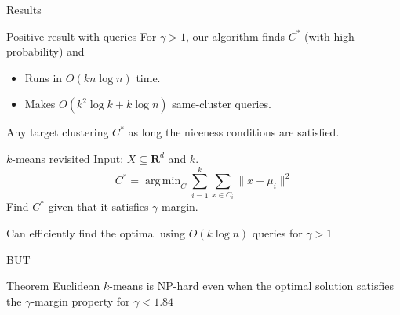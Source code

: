 \documentclass{beamer}
\newcommand{\mb}{\mathbf}
\DeclareMathOperator*{\argmin}{arg\,min}
\begin{document}
\begin{frame}{Results}

	\begin{block}{Positive result with queries}
		\vspace{10pt}For $\gamma > 1$, our algorithm finds $C^*$ (with high probability) and 
		\begin{itemize}
		\vspace{10pt}\item Runs in $O(kn\log n)$ time.
        \vspace{10pt}\item Makes $O(k^2\log k + k\log n)$ same-cluster queries.
		\end{itemize}
	\end{block}
	
	\vspace{20pt}Any target clustering $C^*$ as long the niceness conditions are satisfied. 
\end{frame}

\begin{frame}{$k$-means revisited}
	Input: $X \subseteq \mb R^d$ and $k$.
	\vspace{-10pt}$$C^* = \argmin_{C} \sum_{i=1}^k \sum_{x \in C_i} \|x - \mu_i\|^2$$
	\vspace{10pt}Find $C^*$ given that it satisfies $\gamma$-margin.
	
	\vspace{20pt} {\color{blue}Can efficiently find the optimal using $O(k\log n)$ queries for $\gamma > 1$}
	\begin{center}
		\alert{BUT}
	\end{center}	
	\begin{block}{Theorem}
	Euclidean $k$-means is NP-hard even when the optimal solution satisfies the $\gamma$-margin property for $\gamma < 1.84$
	\end{block}
	
\end{frame}
\end{document}
